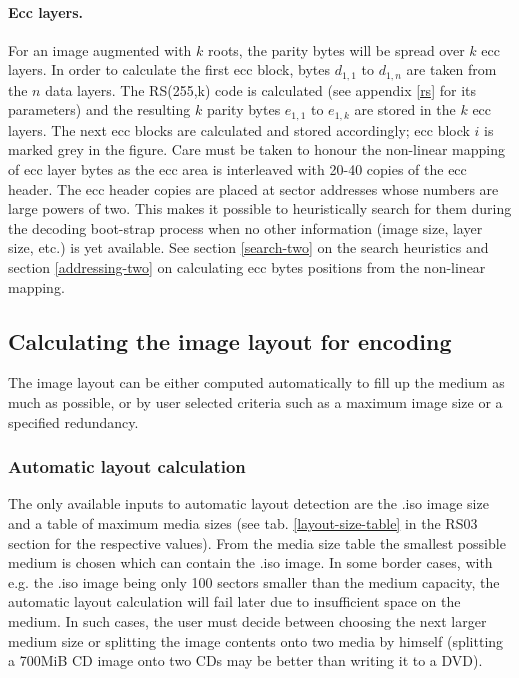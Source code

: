 \paragraph{Ecc layers.} For an image augmented with $k$ roots, the parity bytes
will be spread over $k$ ecc layers. In order to calculate the first ecc block,
bytes $d_{1,1}$ to $d_{1,n}$ are taken from the $n$ data layers. The RS(255,k) code
is calculated (see appendix \ref{rs} for its parameters) and the resulting $k$
parity bytes $e_{1,1}$ to $e_{1,k}$ are stored in the $k$ ecc layers. 
The next ecc blocks are calculated and stored accordingly; ecc block $i$ 
is marked grey in the figure.
Care must be taken to honour the non-linear mapping of
ecc layer bytes as the ecc area is interleaved with 20-40 copies of the ecc header.
The ecc header copies are placed at sector addresses whose numbers 
are large powers of two. This makes it possible to heuristically search for them
during the decoding boot-strap process 
when no other information (image size, layer size, etc.) is yet available.
See section \ref{search-two} on the search heuristics and section \ref{addressing-two}
on calculating ecc bytes positions from the non-linear mapping. 

\subsection{Calculating the image layout for encoding}

The image layout can be either computed automatically to fill up
the medium as much as possible, or by user selected criteria such
as a maximum image size or a specified redundancy.

\subsubsection{Automatic layout calculation}
\label{calc-two}

The only available inputs to automatic layout detection are
the .iso image size and a table of maximum media sizes (see
tab. \ref{layout-size-table} in the RS03 section for the
respective values). From the media size table the smallest
possible medium  is chosen which can contain the .iso image.
In some border cases, with e.g. the .iso image being only
100 sectors smaller than the medium capacity, the automatic
layout calculation will fail later due to insufficient space
on the medium. In such cases, the user must decide between
choosing the next larger medium size or splitting the image
contents onto two media by himself (splitting a 700MiB CD image 
onto two CDs may be better than writing it to a DVD).

